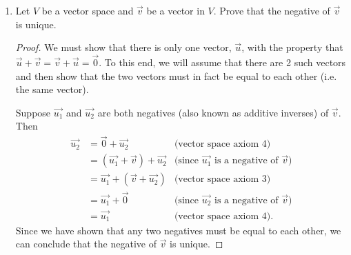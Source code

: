 \documentclass[12pt]{article}
\begin{document}
\begin{enumerate}
\begin{proof}
                      Finally, to show that $W$ is closed under scalar multiplication, suppose $f$ is in $W$ and $k$ is a scalar, then
                      $$
                              (kf)(x) = kf(x) = kf(-x) = (kf(-x),
                      $$
                      so $(kf)$ is in $W$ and $W$ is closed under scalar multiplication.

                      Therefore $W$ is a subspace of $F(-\infty, \infty)$ and hence is a vector space.
              \end{proof}

              \newpage

        \item
              Let $V$ be a vector space and $\vec{v}$ be a vector in $V$. Prove that the negative of $\vec{v}$ is unique.
              \begin{proof}
                      We must show that there is only one vector, $\vec{u}$, with the property that \\
                      $\vec{u} + \vec{v} = \vec{v} + \vec{u} = \vec{0}$. To this end, we will assume that there are 2 such vectors and then show that the two vectors must in fact be equal to each other (i.e. the same vector).

                      Suppose $\vec{u_1}$ and $\vec{u_2}$ are both negatives (also known as additive inverses) of $\vec{v}$. Then
                      \begin{align*}
                              \vec{u_2} & = \vec{0} + \vec{u_2}                & \textrm{(vector space axiom 4)}                         \\
                                        & = (\vec{u_1} + \vec{v}) +  \vec{u_2} & \textrm{(since $\vec{u_1}$ is a negative of $\vec{v}$)} \\
                                        & = \vec{u_1} + (\vec{v} +  \vec{u_2}) & \textrm{(vector space axiom 3)}                         \\
                                        & = \vec{u_1} + \vec{0}                & \textrm{(since $\vec{u_2}$ is a negative of $\vec{v}$)} \\
                                        & = \vec{u_1}                          & \textrm{(vector space axiom 4)}.
                      \end{align*}
                      Since we have shown that any two negatives must be equal to each other, we can conclude that the negative of $\vec{v}$ is unique.
              \end{proof}


\end{enumerate}
\end{document}
